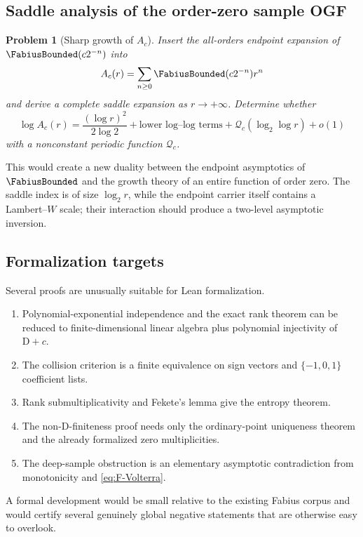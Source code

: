\documentclass[11pt]{article}
\numberwithin{equation}{section}
\newtheorem{problem}[theorem]{Problem}
\theoremstyle{definition}
\theoremstyle{remark}
\newcommand{\D}{\mathrm D}
\begin{document}
\subsection{Saddle analysis of the order-zero sample OGF}

\begin{problem}[Sharp growth of $A_c$]
\label{problem:sample-OGF-asymptotic}
Insert the all-orders endpoint expansion of $\FabiusBounded(c2^{-n})$ into
\begin{equation}
 A_c(r)=\sum_{n\ge0}\FabiusBounded(c2^{-n})r^n
 \label{eq:Ac-saddle-sum}
\end{equation}
and derive a complete saddle expansion as $r\to+\infty$.  Determine whether
\begin{equation}
 \log A_c(r)=\frac{(\log r)^2}{2\log2}
 +\text{lower log--log terms}
 +\mathcal Q_c(\log_2\log r)+o(1)
 \label{eq:Ac-conjectural-growth}
\end{equation}
with a nonconstant periodic function $\mathcal Q_c$.
\end{problem}

This would create a new duality between the endpoint asymptotics of $\FabiusBounded$ and the
growth theory of an entire function of order zero.  The saddle index is of
size $\log_2 r$, while the endpoint carrier itself contains a Lambert--$W$
scale; their interaction should produce a two-level asymptotic inversion.

\subsection{Formalization targets}

Several proofs are unusually suitable for Lean formalization.
\begin{enumerate}
 \item Polynomial-exponential independence and the exact rank theorem can be
       reduced to finite-dimensional linear algebra plus polynomial
       injectivity of $\D+c$.
 \item The collision criterion is a finite equivalence on sign vectors and
       $\{-1,0,1\}$ coefficient lists.
 \item Rank submultiplicativity and Fekete's lemma give the entropy theorem.
 \item The non-D-finiteness proof needs only the ordinary-point uniqueness
       theorem and the already formalized zero multiplicities.
 \item The deep-sample obstruction is an elementary asymptotic contradiction
       from monotonicity and \eqref{eq:F-Volterra}.
\end{enumerate}
A formal development would be small relative to the existing Fabius corpus and
would certify several genuinely global negative statements that are otherwise
easy to overlook.
\end{document}
